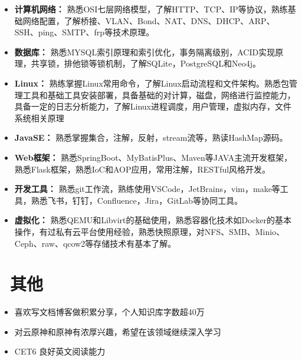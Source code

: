 \documentclass[11pt]{article}
\begin{document}
\begin{itemize}
    \item \textbf{计算机网络：} 熟悉OSI七层网络模型，了解HTTP、TCP、IP等协议，熟练基础网络配置，了解桥接、VLAN、Bond、NAT、DNS、DHCP、ARP、SSH、ping、SMTP、frp等技术原理。

    \item \textbf{数据库：} 熟悉MYSQL索引原理和索引优化，事务隔离级别，ACID实现原理，共享锁，排他锁等锁机制，了解SQLite，PostgreSQL和Neo4j。
    \item \textbf{Linux：} 熟练掌握Linux常用命令，了解Linux启动流程和文件架构。熟悉包管理工具和基础工具安装部署，具备基础的对计算，磁盘，网络进行监控能力，具备一定的日志分析能力，了解Linux进程调度，用户管理，虚拟内存，文件系统相关原理
    \item \textbf{JavaSE：} 熟悉掌握集合，注解，反射，stream流等，熟读HashMap源码。
    \item \textbf{Web框架：} 熟悉SpringBoot、MyBatisPlus、Maven等JAVA主流开发框架，熟悉Flask框架，熟悉IoC和AOP应用，常用注解，RESTful风格开发。
    
    \item \textbf{开发工具：} 熟悉git工作流，熟练使用VSCode，JetBrains，vim，make等工具，熟悉飞书，钉钉，Confluence，Jira，GitLab等协同工具。

  
    \item \textbf{虚拟化：} 熟悉QEMU和Libvirt的基础使用，熟悉容器化技术如Docker的基本操作，有过私有云平台使用经验，熟悉快照原理，对NFS、SMB、Minio、Ceph、raw、qcow2等存储技术有基本了解。

\end{itemize}




\section{\makebox[\widthof{\faGraduationCap}][c]{\color{CVBlue}\faTags}\ 其他} 
  \begin{itemize}
    \item 喜欢写文档博客做积累分享，个人知识库字数超40万
    \item  对云原神和原神有浓厚兴趣，希望在该领域继续深入学习
    \item  CET6  良好英文阅读能力  
\end{itemize}

 



\end{document}
